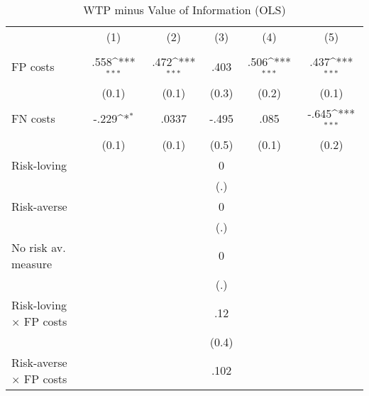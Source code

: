 \begin{table}[htbp]\centering
\def\sym#1{\ifmmode^{#1}\else\(^{#1}\)\fi}
\caption{WTP minus Value of Information (OLS)}
\begin{tabular}{l*{5}{c}}
\hline\hline
                &\multicolumn{1}{c}{(1)}&\multicolumn{1}{c}{(2)}&\multicolumn{1}{c}{(3)}&\multicolumn{1}{c}{(4)}&\multicolumn{1}{c}{(5)}\\
                &\multicolumn{1}{c}{}&\multicolumn{1}{c}{}&\multicolumn{1}{c}{}&\multicolumn{1}{c}{}&\multicolumn{1}{c}{}\\
\hline
FP costs        &     .558\sym{***}&     .472\sym{***}&     .403         &     .506\sym{***}&     .437\sym{***}\\
                &    (0.1)         &    (0.1)         &    (0.3)         &    (0.2)         &    (0.1)         \\
FN costs        &    -.229\sym{*}  &    .0337         &    -.495         &     .085         &    -.645\sym{***}\\
                &    (0.1)         &    (0.1)         &    (0.5)         &    (0.1)         &    (0.2)         \\
Risk-loving     &                  &                  &        0         &                  &                  \\
                &                  &                  &      (.)         &                  &                  \\
Risk-averse     &                  &                  &        0         &                  &                  \\
                &                  &                  &      (.)         &                  &                  \\
No risk av. measure&                  &                  &        0         &                  &                  \\
                &                  &                  &      (.)         &                  &                  \\
Risk-loving $\times$ FP costs&                  &                  &      .12         &                  &                  \\
                &                  &                  &    (0.4)         &                  &                  \\
Risk-averse $\times$ FP costs&                  &                  &     .102         &                  &                  \\

\end{tabular}
\end{table}

